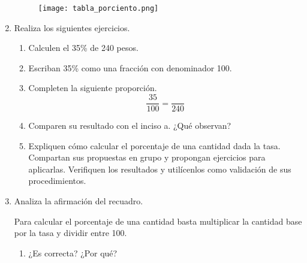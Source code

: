\begin{enumerate}
          \begin{figure}[H]
              \centering
              \texttt{[image: tabla\_porciento.png]}
              \label{fig:tabla_porciento}
          \end{figure}
    \item Realiza los siguientes ejercicios.
          \begin{enumerate}
              \item Calculen el 35\% de 240 pesos.
              \item Escriban 35\% como una fracción con denominador 100.
              \item Completen la siguiente proporción.
                    \[\dfrac{35}{100} = \dfrac{}{240}\]
              \item Comparen su resultado con el inciso a. ¿Qué observan?
              \item Expliquen cómo calcular el porcentaje de una cantidad dada la tasa. Compartan
                    sus propuestas en grupo y propongan ejercicios para aplicarlas. Verifiquen los
                    resultados y utilícenlos como validación de sus procedimientos.
          \end{enumerate}
    \item Analiza la afirmación del recuadro.
          \begin{boxH}
              Para calcular el porcentaje de una cantidad basta multiplicar la cantidad base por
              la tasa y dividir entre 100.
          \end{boxH}
          \begin{enumerate}
              \item ¿Es correcta? ¿Por qué?
          \end{enumerate}
\end{enumerate}

